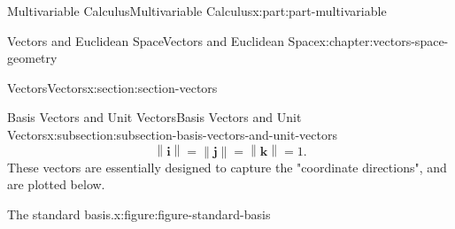 \documentclass[twoside,10pt,]{book}
\numberwithin{equation}{part}
\newcommand{\norm}[1]{\left\| #1 \right\|}
\begin{document}
\begin{partptx}{Multivariable Calculus}{}{Multivariable Calculus}{}{}{x:part:part-multivariable}
\begin{chapterptx}{Vectors and Euclidean Space}{}{Vectors and Euclidean Space}{}{}{x:chapter:vectors-space-geometry}
\begin{sectionptx}{Vectors}{}{Vectors}{}{}{x:section:section-vectors}
\begin{subsectionptx}{Basis Vectors and Unit Vectors}{}{Basis Vectors and Unit Vectors}{}{}{x:subsection:subsection-basis-vectors-and-unit-vectors}
%
\begin{equation*}
\norm{\mathbf{i}} = \norm{\mathbf{j}} = \norm{\mathbf{k}} = 1.
\end{equation*}
These vectors are essentially designed to capture the "coordinate directions", and are plotted below.%
\begin{figureptx}{The standard basis.}{x:figure:figure-standard-basis}{}%
\begin{image}{0.2}{0.6}{0.2}%
\end{image}
\end{figureptx}
\end{subsectionptx}
\end{sectionptx}
\end{chapterptx}
\end{partptx}
\end{document}
